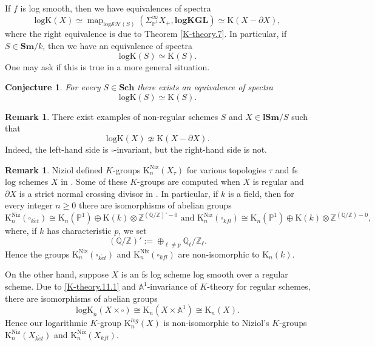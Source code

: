 \documentclass[11pt, a4paper]{amsart}
\newtheorem{conj}[thm]{Conjecture}
\theoremstyle{definition}
\newtheorem{rmk}[thm]{Remark}
\numberwithin{equation}{subsection}
\newcommand{\Z}{\mathbb{Z}}
\newcommand{\Q}{\mathbb{Q}}
\renewcommand{\P}{\mathbb{P}}
\newcommand{\A}{\mathbb{A}}
\newcommand{\Sch}{\mathbf{Sch}}
\newcommand{\Sm}{\mathbf{Sm}}
\newcommand{\lSm}{\mathbf{lSm}}
\newcommand{\Kth}{\mathrm{K}}
\newcommand{\KthNiz}{\mathrm{K}^{\mathrm{Niz}}}
\newcommand{\et}{{\acute{e}t}}
\newcommand{\logKGL}{\mathbf{logKGL}}
\newcommand{\Kthlog}{\mathrm{logK}}
\newcommand{\boxx}{\square}
\newcommand{\inflogSH}{\mathrm{log}\mathcal{SH}}
\newcommand{\map}{\operatorname{map}}
\begin{document}
If $f$ is log smooth, 
then we have equivalences of spectra
\begin{equation}
\label{K-theory.11.1}
\Kthlog(X)
\simeq
\map_{\inflogSH(S)}(\Sigma_{\P^1}^\infty X_+,\logKGL)
\simeq
\Kth(X-\partial X),
\end{equation}
where the right equivalence is due to 
Theorem \ref{K-theory.7}.
In particular, if $S\in \Sm/k$, then we have an equivalence of spectra
\[
\Kthlog(S)
\simeq
\Kth(S).
\]
One may ask if this is true in a more general situation.

\begin{conj}
\label{K-theory.12}
For every $S\in \Sch$ there exists an equivalence of spectra
\[
\Kthlog(S)
\simeq
\Kth(S).
\]
\end{conj}

\begin{rmk}
There exist examples of non-regular schemes $S$ and $X\in \lSm/S$ such that
\[
\Kthlog(X) \not \simeq \Kth(X-\partial X).
\]
Indeed, 
the left-hand side is $\boxx$-invariant, but the right-hand side is not.
\end{rmk}

\begin{rmk}
\label{K-theory.13}
Niziol defined $K$-groups $\KthNiz_n(X_{\tau})$ for various topologies $\tau$ 
and fs log schemes $X$ in \cite{MR2452875}.
Some of these $K$-groups are computed when $X$ is regular and $\partial X$ 
is a strict normal crossing divisor in \cite[Corollary 4.17]{MR2452875}.
In particular, if $k$ is a field, 
then for every integer $n\geq 0$ there are isomorphisms of abelian groups
\[
\KthNiz_n(\boxx_{k\et}) 
\cong
\Kth_n(\P^1)\oplus \Kth(k)\otimes \Z^{(\Q/\Z)'-0}
\text{ and }
\KthNiz_n(\boxx_{kfl})
\cong
\Kth_n(\P^1)\oplus \Kth(k)\otimes \Z^{(\Q/\Z)-0},
\]
where, 
if $k$ has characteristic $p$, we set 
$$(\Q/\Z)':=\oplus_{\ell\neq p} \Q_\ell/\Z_\ell.$$ 
Hence the groups $\KthNiz_n(\boxx_{k\et})$ and $\KthNiz_n(\boxx_{kfl})$ are non-isomorphic to $\Kth_n(k)$.

On the other hand, 
suppose $X$ is an fs log scheme log smooth over a regular scheme.
Due to \eqref{K-theory.11.1} and $\A^1$-invariance of $K$-theory for regular schemes, 
there are isomorphisms of abelian groups
\[
\Kthlog_n(X\times \boxx)\cong \Kth_n(X\times \A^1)\cong \Kth_n(X).
\]
Hence our logarithmic $K$-group $\Kth_n^{log}(X)$ is non-isomorphic to Niziol's $K$-groups 
$\KthNiz_n(X_{k\et})$ and $\KthNiz_n(X_{kfl})$.
\end{rmk}
\end{document}
